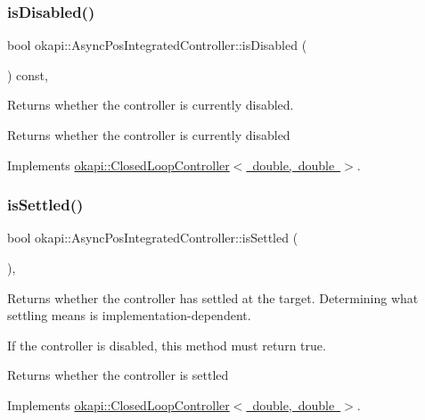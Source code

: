 \subsubsection{\texorpdfstring{isDisabled()}{isDisabled()}}
{\footnotesize\ttfamily bool okapi\+::\+Async\+Pos\+Integrated\+Controller\+::is\+Disabled (\begin{DoxyParamCaption}{ }\end{DoxyParamCaption}) const\hspace{0.3cm}{\ttfamily [override]}, {\ttfamily [virtual]}}

Returns whether the controller is currently disabled.

\begin{DoxyReturn}{Returns}
whether the controller is currently disabled 
\end{DoxyReturn}


Implements \mbox{\hyperlink{classokapi_1_1ClosedLoopController_a40bd4ec2b8c75503fbf6f494fd7cbe69}{okapi\+::\+Closed\+Loop\+Controller$<$ double, double $>$}}.

\mbox{\label{classokapi_1_1AsyncPosIntegratedController_a21b7ee29d335ee33aed1c41969a27f62}} 
\subsubsection{\texorpdfstring{isSettled()}{isSettled()}}
{\footnotesize\ttfamily bool okapi\+::\+Async\+Pos\+Integrated\+Controller\+::is\+Settled (\begin{DoxyParamCaption}{ }\end{DoxyParamCaption})\hspace{0.3cm}{\ttfamily [override]}, {\ttfamily [virtual]}}

Returns whether the controller has settled at the target. Determining what settling means is implementation-\/dependent.

If the controller is disabled, this method must return true.

\begin{DoxyReturn}{Returns}
whether the controller is settled 
\end{DoxyReturn}


Implements \mbox{\hyperlink{classokapi_1_1ClosedLoopController_aed7aa0e94b6474c28314f8517d6cb4d8}{okapi\+::\+Closed\+Loop\+Controller$<$ double, double $>$}}.

